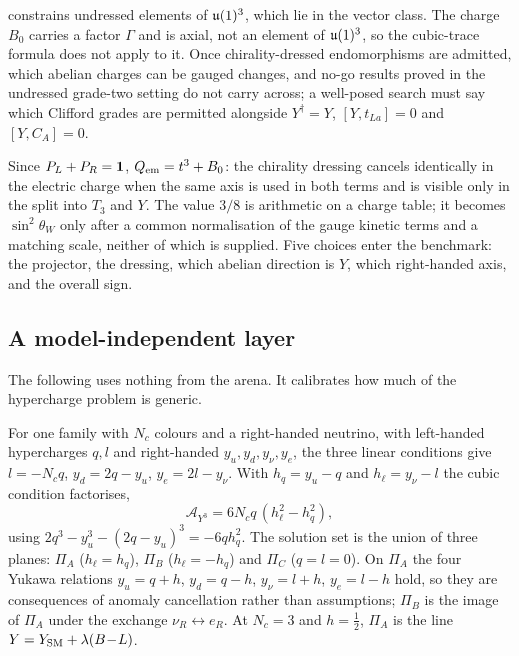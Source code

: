 \begin{proposition}
\label{prop:escape}
 constrains undressed elements of $\mathfrak{u}(1)^3$, which lie in the vector class. The charge $B_0$ carries a factor $\Gamma$ and is
axial, not an element of $\mathfrak{u}(1)^3$, so the cubic-trace formula does not apply to it. Once chirality-dressed endomorphisms are admitted,
which abelian charges can be gauged changes, and no-go results proved in the undressed grade-two setting do not carry across; a well-posed
search must say which Clifford grades are permitted alongside $Y^\dagger=Y$, $[Y,t_{La}]=0$ and $[Y,C_A]=0$.
\end{proposition}

Since $P_L+P_R=\mathbf 1$, $Q_{\rm em}=t^3+B_0$: the chirality dressing cancels identically in the electric charge when the same axis is used in
both terms and is visible only in the split into $T_3$ and $Y$. The value $3/8$ is arithmetic on a charge table; it becomes $\sin^2\theta_W$
only after a common normalisation of the gauge kinetic terms and a matching scale, neither of which is supplied. Five choices enter the
benchmark: the projector, the dressing, which abelian direction is $Y$, which right-handed axis, and the overall sign.

\subsection{A model-independent layer}
\label{sec:modelindep}

The following uses nothing from the arena. It calibrates how much of the hypercharge problem is generic.

\begin{theorem}
\label{thm:variety}
For one family with $N_c$ colours and a right-handed neutrino, with left-handed hypercharges $q,l$ and right-handed $y_u,y_d,y_\nu,y_e$,
the three linear conditions give $l=-N_cq$, $y_d=2q-y_u$, $y_e=2l-y_\nu$. With $h_q=y_u-q$ and $h_\ell=y_\nu-l$ the cubic condition
factorises,
\[
\mathcal A_{Y^3}=6N_cq\,(h_\ell^2-h_q^2),
\]
using $2q^3-y_u^3-(2q-y_u)^3=-6qh_q^2$. The solution set is the union of three planes: $\Pi_A$ ($h_\ell=h_q$), $\Pi_B$ ($h_\ell=-h_q$) and
$\Pi_C$ ($q=l=0$). On $\Pi_A$ the four Yukawa relations $y_u=q+h$, $y_d=q-h$, $y_\nu=l+h$, $y_e=l-h$ hold, so they are consequences of anomaly
cancellation rather than assumptions; $\Pi_B$ is the image of $\Pi_A$ under the exchange $\nu_R\leftrightarrow e_R$. At $N_c=3$ and
$h=\tfrac12$, $\Pi_A$ is the line $Y=Y_{\rm SM}+\lambda(B\!-\!L)$.
\end{theorem}


